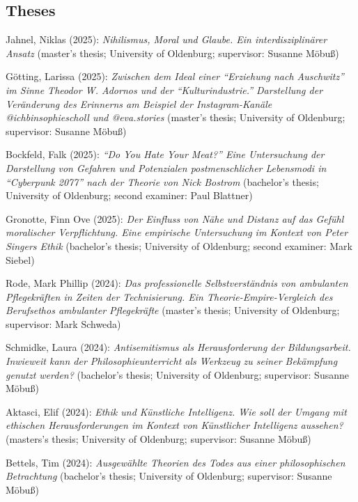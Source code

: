 \documentclass[a4paper,10pt]{article}
\newenvironment{literature}{%
   \parskip6pt\parindent0pt\raggedright
   \def\lititem{\hangindent=1cm\hangafter1}}{%
   \par\ignorespaces}
\begin{document}
\subsection*{Theses}
\begin{literature}
\lititem Jahnel, Niklas (2025): \textit{Nihilismus, Moral und Glaube. Ein interdisziplinärer Ansatz} (master's thesis; University of Oldenburg; supervisor: Susanne Möbuß)

\lititem Götting, Larissa (2025): \textit{Zwischen dem Ideal einer \enquote{Erziehung nach Auschwitz} im Sinne Theodor W. Adornos und der \enquote{Kulturindustrie.} Darstellung der Veränderung des Erinnerns am Beispiel der Instagram-Kanäle @ichbinsophiescholl und @eva.stories} (master's thesis; University of Oldenburg; supervisor: Susanne Möbuß)

\lititem Bockfeld, Falk (2025): \textit{\enquote{Do You Hate Your Meat?} Eine Untersuchung der Darstellung von Gefahren und Potenzialen postmenschlicher Lebensmodi in \enquote{Cyberpunk 2077} nach der Theorie von Nick Bostrom} (bachelor's thesis; University of Oldenburg; second examiner: Paul Blattner)

\lititem Gronotte, Finn Ove (2025): \textit{Der Einfluss von Nähe und Distanz auf das Gefühl moralischer Verpflichtung. Eine empirische Untersuchung im Kontext von Peter Singers Ethik} (bachelor's thesis; University of Oldenburg; second examiner: Mark Siebel)

\lititem Rode, Mark Phillip (2024): \textit{Das professionelle Selbstverständnis von ambulanten Pflegekräften in Zeiten der Technisierung. Ein Theorie-Empire-Vergleich des Berufsethos ambulanter Pflegekräfte} (master's thesis; University of Oldenburg; supervisor: Mark Schweda)

\lititem Schmidke, Laura (2024): \textit{Antisemitismus als Herausforderung der Bildungsarbeit. Inwieweit kann der Philosophieunterricht als Werkzeug zu seiner Bekämpfung genutzt werden?} (bachelor's thesis; University of Oldenburg; supervisor: Susanne Möbuß)

\lititem Aktasci, Elif (2024): \textit{Ethik und Künstliche Intelligenz. Wie soll der Umgang mit ethischen Herausforderungen im Kontext von Künstlicher Intelligenz aussehen?} (masters's thesis; University of Oldenburg; supervisor: Susanne Möbuß)

\lititem Bettels, Tim (2024): \textit{Ausgewählte Theorien des Todes aus einer philosophischen Betrachtung} (bachelor's thesis; University of Oldenburg; supervisor: Susanne Möbuß)


\end{literature}
\end{document}
